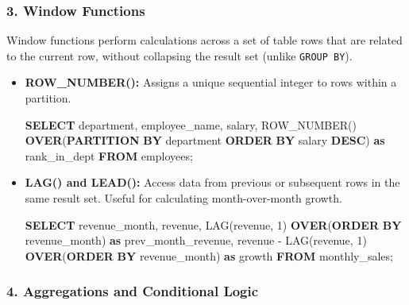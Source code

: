 \documentclass[
  11pt,
  openany,
  oneside]{book}
\newenvironment{Shaded}{}{}
\newcommand{\DecValTok}[1]{\textcolor[rgb]{0.25,0.63,0.44}{#1}}
\newcommand{\FunctionTok}[1]{\textcolor[rgb]{0.02,0.16,0.49}{#1}}
\newcommand{\KeywordTok}[1]{\textcolor[rgb]{0.00,0.44,0.13}{\textbf{#1}}}
\newcommand{\NormalTok}[1]{#1}
\newcommand{\OperatorTok}[1]{\textcolor[rgb]{0.40,0.40,0.40}{#1}}
\begin{document}
\subsubsection{3. Window Functions}\label{window-functions-1}

Window functions perform calculations across a set of table rows that
are related to the current row, without collapsing the result set
(unlike \texttt{GROUP\ BY}).

\begin{itemize}
\item
  \textbf{ROW\_NUMBER():} Assigns a unique sequential integer to rows
  within a partition.

\begin{Shaded}
\begin{Highlighting}[]
\KeywordTok{SELECT} 
\NormalTok{    department,}
\NormalTok{    employee\_name,}
\NormalTok{    salary,}
    \FunctionTok{ROW\_NUMBER}\NormalTok{() }\KeywordTok{OVER}\NormalTok{(}\KeywordTok{PARTITION} \KeywordTok{BY}\NormalTok{ department }\KeywordTok{ORDER} \KeywordTok{BY}\NormalTok{ salary }\KeywordTok{DESC}\NormalTok{) }\KeywordTok{as}\NormalTok{ rank\_in\_dept}
\KeywordTok{FROM}\NormalTok{ employees;}
\end{Highlighting}
\end{Shaded}
\item
  \textbf{LAG() and LEAD():} Access data from previous or subsequent
  rows in the same result set. Useful for calculating month-over-month
  growth.

\begin{Shaded}
\begin{Highlighting}[]
\KeywordTok{SELECT} 
\NormalTok{    revenue\_month,}
\NormalTok{    revenue,}
    \FunctionTok{LAG}\NormalTok{(revenue, }\DecValTok{1}\NormalTok{) }\KeywordTok{OVER}\NormalTok{(}\KeywordTok{ORDER} \KeywordTok{BY}\NormalTok{ revenue\_month) }\KeywordTok{as}\NormalTok{ prev\_month\_revenue,}
\NormalTok{    revenue }\OperatorTok{{-}} \FunctionTok{LAG}\NormalTok{(revenue, }\DecValTok{1}\NormalTok{) }\KeywordTok{OVER}\NormalTok{(}\KeywordTok{ORDER} \KeywordTok{BY}\NormalTok{ revenue\_month) }\KeywordTok{as}\NormalTok{ growth}
\KeywordTok{FROM}\NormalTok{ monthly\_sales;}
\end{Highlighting}
\end{Shaded}
\end{itemize}

\subsubsection{4. Aggregations and Conditional
Logic}\label{aggregations-and-conditional-logic}
\end{document}
